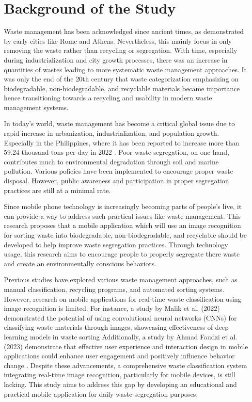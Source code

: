 \section{Background of the Study}
Waste management has been acknowledged since ancient times, as demonstrated by early cities like Rome and Athens. Nevertheless, this mainly focus in only removing the waste rather than recycling or segregation. With time, especially during industrialization and city growth processes, there was an increase in quantities of wastes leading to more systematic waste management approaches. It was only the end of the 20th century that waste categorization emphasizing on biodegradable, non-biodegradable, and recyclable materials became importance hence transitioning towards a recycling and usability in modern waste management systems.

In today's world, waste management has become a critical global issue due to rapid increase in urbanization, industrialization, and population growth. Especially in the Philippines, where it has been reported to increase more than 59.24 thousand tons per day in 2022 \parencite{Statista2022}. Poor waste segregation, on one hand, contributes much to environmental degradation through soil and marine pollution. Various policies have been implemented to encourage proper waste disposal. However, public awareness and participation in proper segregation practices are still at a minimal rate.

Since mobile phone technology is increasingly becoming parts of people's live, it can provide a way to address such practical issues like waste management. This research proposes that a mobile application which will use an image recognition for sorting waste into biodegradable, non-biodegradable, and recyclable should be developed to help improve waste segregation practices. Through technology usage, this research aims to encourage people to properly segregate there waste and create an environmentally conscious behaviors.

Previous studies have explored various waste management approaches, such as manual classification, recycling programs, and automated sorting systems. However, research on mobile applications for real-time waste classification using image recognition is limited. For instance, a study by Malik et al. (2022) demonstrated the potential of using convolutional neural networks (CNNs) for classifying waste materials through images, showcasing effectiveness of deep learning models in waste sorting \parencite{Malik2022} Additionally, a study by Ahmad Faudzi et al. (2023) demonstrate that effective user experience and interaction design in mobile applications could enhance user engagement and positively influence behavior change \parencite{AhmadFaudzi2023}. Despite these advancements, a comprehensive waste classification system integrating real-time image recognition, particularly for mobile devices, is still lacking. This study aims to address this gap by developing an educational and practical mobile application for daily waste segregation purposes.